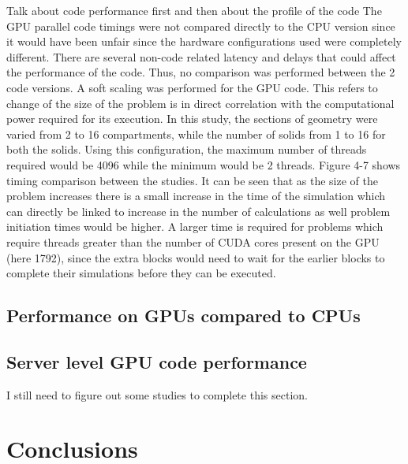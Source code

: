\documentclass[preprint,10pt,authoryear,review]{elsarticle}
\begin{document}
\begin{linenumbers}
Talk about code performance first and then about the profile of the code
The GPU parallel code timings were not compared directly to the CPU 
version since it would have been unfair since the hardware configurations 
used were completely different. There are several non-code related latency 
and delays that could affect the performance of the code. Thus, no 
comparison was performed between the 2 code versions. 
A soft scaling was performed for the GPU code. This refers to change of 
the size of the problem is in direct correlation with the computational 
power required for its execution. In this study, the sections of geometry 
were varied from 2 to 16 compartments, while the number of solids from 1 
to 16 for both the solids. Using this configuration, the maximum number 
of threads required would be 4096 while the minimum would be 2 threads. 
Figure 4-7 shows timing comparison between the studies. It can be seen 
that as the size of the problem increases there is a small increase in 
the time of the simulation which can directly be linked to increase in 
the number of calculations as well problem initiation times would be 
higher. A larger time is required for problems which require threads 
greater than the number of CUDA cores present on the GPU (here 1792), 
since the extra blocks would need to wait for the earlier blocks to 
complete their simulations before they can be executed.

\subsection{Performance on GPUs compared to CPUs}

\subsection{Server level GPU code performance}



I still need to figure out some studies to complete this section.

\section{Conclusions}
\label{secConc}
\end{linenumbers}



\end{document}
